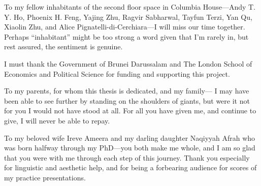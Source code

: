 \documentclass[11pt,twoside,openright,showframe]{report}
\begin{document}
To my fellow inhabitants of the second floor space in Columbia House---Andy T. Y. Ho, Phoenix H. Feng, Yajing Zhu, Ragvir Sabharwal, Tayfun Terzi, Yan Qu, Xiaolin Zhu, and Alice Pignatelli-di-Cerchiara---I will miss our time together.
Perhaps ``inhabitant'' might be too strong a word given that I'm rarely in, but rest assured, the sentiment is genuine.

I must thank the Government of Brunei Darussalam and The London School of Economics and Political Science for funding and supporting this project.

To my parents, for whom this thesis is dedicated, and my family---
I may have been able to see further by standing on the shoulders of giants, but were it not for you I would not have stood at all.
For all you have given me, and continue to give, I will never be able to repay.

To my beloved wife Ireve Ameera and my darling daughter Naqiyyah Afrah who was born halfway through my PhD---you both make me whole, and I am so glad that you were with me through each step of this journey.
Thank you especially for linguistic and aesthetic help, and for being a forbearing audience for scores of my practice presentations.
\end{document}
